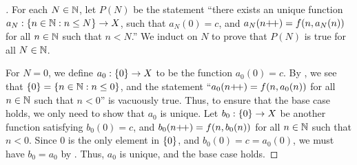 \begin{proof}[]
  For each \(N \in \mathbb{N}\), let \(P(N)\) be the statement ``there exists an unique function \(a_N : \left\lbrace n \in \mathbb{N} : n \leq N\right\rbrace \to X\), such that \(a_N(0) = c\), and \(a_N(n{+}\!{+}) = f(n, a_N(n))\) for all \(n \in \mathbb{N}\) such that \(n < N\).''
  We induct on \(N\) to prove that \(P(N)\) is true for all \(N \in \mathbb{N}\).

  For \(N = 0\), we define \(a_0 : \left\lbrace0\right\rbrace \to X\) to be the function \(a_0(0) = c\).
  By , we see that \(\left\lbrace0\right\rbrace = \left\lbrace n \in \mathbb{N} : n \leq 0\right\rbrace\), and the statement ``\(a_0(n{+}\!{+}) = f(n, a_0(n))\) for all \(n \in \mathbb{N}\) such that \(n < 0\)'' is vacuously true.
  Thus, to ensure that the base case holds, we only need to show that \(a_0\) is unique.
  Let \(b_0 : \left\lbrace0\right\rbrace \to X\) be another function satisfying \(b_0(0) = c\), and \(b_0(n{+}\!{+}) = f(n, b_0(n))\) for all \(n \in \mathbb{N}\) such that \(n < 0\).
  Since \(0\) is the only element in \(\left\lbrace0\right\rbrace\), and \(b_0(0) = c = a_0(0)\), we must have \(b_0 = a_0\) by .
  Thus, \(a_0\) is unique, and the base case holds.


\end{proof}
